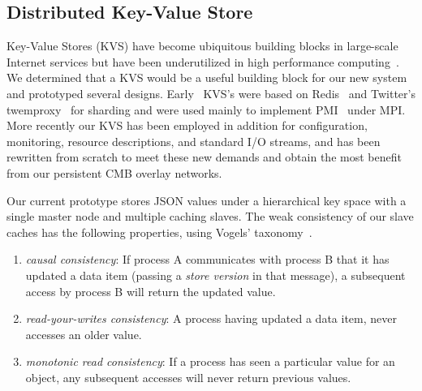 \subsection{Distributed Key-Value Store}

Key-Value Stores (KVS) have become ubiquitous building blocks in large-scale
Internet services but have been underutilized in high performance
computing~\cite{Wang:2013:USE:2503210.2503239}.
We determined that a KVS would be a
useful building block for our new system and prototyped several designs.
Early \flux\ KVS's were based on Redis~\cite{Redis} and Twitter's
twemproxy~\cite{Twemproxy} for sharding and were used mainly to implement
PMI~\cite{PMI2} under MPI.  More recently our KVS has been employed 
in addition for configuration, monitoring, resource descriptions, and
standard I/O streams, and has been rewritten from scratch to meet these
new demands and obtain the most benefit from our persistent CMB overlay
networks.

Our current prototype stores JSON values under a hierarchical key space
with a single master node and multiple caching slaves.  The weak consistency
of our slave caches has the following properties, using Vogels'
taxonomy~\cite{Vogels:2009:EC:1435417.1435432}.

\begin{enumerate}
\item{{\em causal consistency}:  If process A communicates with process B
that it has updated a data item (passing a {\em store version} in that
message), a subsequent access by process B will return the updated value.}
\item{{\em read-your-writes consistency}:  A process having updated a
data item, never accesses an older value.}
\item{{\em monotonic read consistency}:  If a process has seen a particular
value for an object, any subsequent accesses will never return previous values.}
\end{enumerate}

